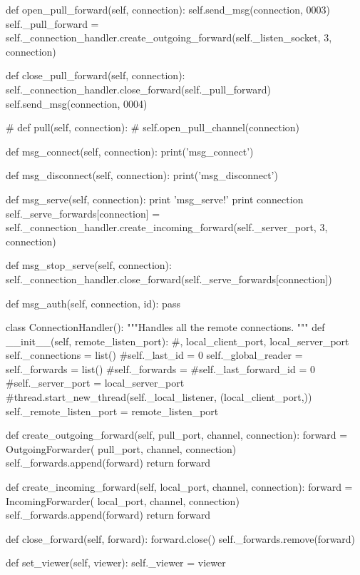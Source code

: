     def open_pull_forward(self, connection):
        self.send_msg(connection, 0003)
        self._pull_forward = self._connection_handler.create_outgoing_forward(self._listen_socket, 3, connection)

    def close_pull_forward(self, connection):
        self._connection_handler.close_forward(self._pull_forward)
        self.send_msg(connection, 0004)


#    def pull(self, connection):
#        self.open_pull_channel(connection)
        
    def msg_connect(self, connection):
        print('msg_connect')

    def msg_disconnect(self, connection):
        print('msg_disconnect')

    def msg_serve(self, connection):
        print 'msg_serve!'
        print connection
        self._serve_forwards[connection] = self._connection_handler.create_incoming_forward(self._server_port, 3, connection)

    def msg_stop_serve(self, connection):
        self._connection_handler.close_forward(self._serve_forwards[connection])

    def msg_auth(self, connection, id):
        pass


class ConnectionHandler():
    """Handles all the remote connections.
    """
    def __init__(self, remote_listen_port):
        #, local_client_port, local_server_port
        self._connections = list()
        #self._last_id    = 0
        self._global_reader = {}
        self._forwards      = list()
        #self._forwards        = {}
        #self._last_forward_id = 0
        #self._server_port = local_server_port
        #thread.start_new_thread(self._local_listener, (local_client_port,))
        self._remote_listen_port = remote_listen_port

    def create_outgoing_forward(self, pull_port, channel, connection):
        forward = OutgoingForwarder(
            pull_port, channel,
            connection)
        self._forwards.append(forward)
        return forward

    def create_incoming_forward(self, local_port, channel, connection):
        forward = IncomingForwarder(
            local_port, channel,
            connection)
        self._forwards.append(forward)
        return forward

    def close_forward(self, forward):
        forward.close()
        self._forwards.remove(forward)

    def set_viewer(self, viewer):
        self._viewer = viewer

